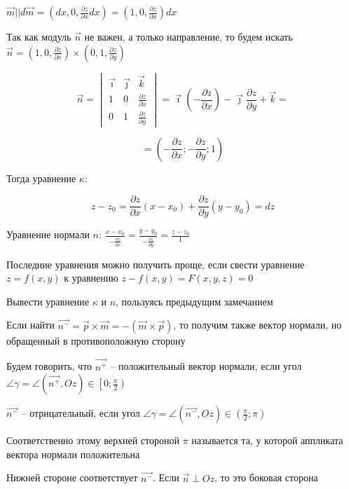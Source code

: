 \documentclass[12pt]{article}
\begin{document}
    $\vec{m} || d\vec{m} = \left(dx, 0, \frac{\partial z}{\partial x}dx\right) = \left(1, 0, \frac{\partial z}{\partial x}\right) dx$

    Так как модуль $\vec{n}$ не важен, а только направление, то будем искать
    $\vec{n} = \left(1, 0, \frac{\partial z}{\partial x}\right) \times \left(0, 1, \frac{\partial z}{\partial y}\right)$

    \[\vec{n} =
    \begin{vmatrix} \vec\imath & \vec\jmath & \vec k \\
        1 & 0 & \frac{\partial z}{\partial x} \\ 0 & 1 & \frac{\partial z}{\partial y}
    \end{vmatrix} = \vec\imath \left(-\frac{\partial z}{\partial x}\right) - \vec\jmath \frac{\partial z}{\partial y} + \vec k = \]

    \[= \left(-\frac{\partial z}{\partial x}; -\frac{\partial z}{\partial y}; 1\right)\]

    Тогда уравнение $\kappa$:

    \[z - z_0 = \frac{\partial z}{\partial x}(x - x_0) + \frac{\partial z}{\partial y} (y - y_0) = dz\]

    Уравнение нормали $n$: $\frac{x - x_0}{-\frac{\partial z}{\partial x}} = \frac{y - y_0}{-\frac{\partial z}{\partial y}} = \frac{z - z_0}{1}$

    \Nota Последние уравнения можно получить проще, если свести уравнение $z = f(x, y)$ к уравнению $z - f(x, y) = F(x, y, z) = 0$

    \Lab Вывести уравнение $\kappa$ и $n$, пользуясь предыдущим замечанием

    \Nota Если найти $\vec{n^-} = \vec{p} \times \vec{m} = - (\vec{m} \times \vec{p})$, то получим также вектор нормали, но обращенный в противоположную сторону

    Будем говорить, что $\vec{n^+}$ -- положительный вектор нормали, если угол $\angle\gamma = \angle (\vec{n^+}, Oz) \in \left[0; \frac{\pi}{2}\right)$

    $\vec{n^-}$ -- отрицательный, если угол $\angle\gamma = \angle (\overrightarrow{n^-}, Oz) \in \left(\frac{\pi}{2}; \pi\right)$

    Соответственно этому верхней стороной $\pi$ называется та, у которой аппликата вектора нормали положительна

    Нижней стороне соответствует $\overrightarrow{n^-}$. Если $\overrightarrow{n} \perp Oz$, то это боковая сторона
\end{document}
